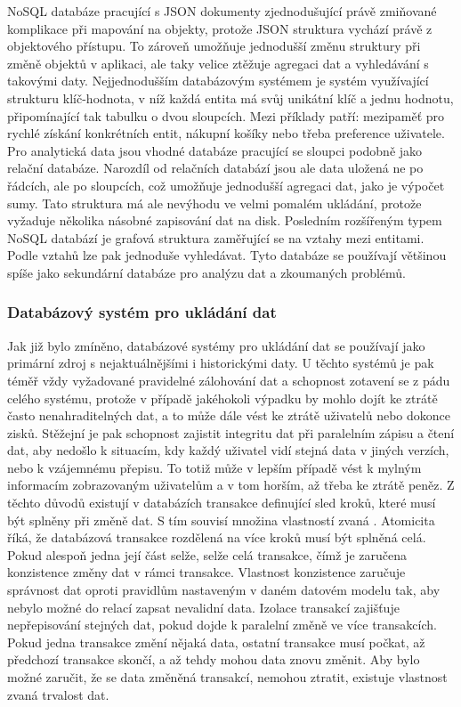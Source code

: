 	\Ac{NoSQL} databáze pracující s \Ac{JSON} dokumenty zjednodušující právě zmiňované komplikace při mapování
	na objekty, protože \Ac{JSON} struktura vychází právě z objektového přístupu.
	To zároveň umožňuje jednodušší změnu struktury při změně objektů v aplikaci, ale taky velice ztěžuje agregaci dat
	a vyhledávání s takovými daty.
	Nejjednodušším databázovým systémem je systém využívající strukturu klíč-hodnota, v níž každá entita má svůj unikátní klíč
	a jednu hodnotu, připomínající tak tabulku o dvou sloupcích.
	Mezi příklady patří: mezipaměť pro rychlé získání konkrétních entit, nákupní košíky nebo třeba preference uživatele.
	Pro analytická data jsou vhodné databáze pracující se sloupci podobně jako relační databáze.
	Narozdíl od relačních databází jsou ale data uložená ne po řádcích, ale po sloupcích, což umožňuje jednodušší agregaci
	dat, jako je výpočet sumy.
	Tato struktura má ale nevýhodu ve velmi pomalém ukládání, protože vyžaduje několika násobné zapisování dat na disk.
	Posledním rozšířeným typem \Ac{NoSQL} databází je grafová struktura zaměřující se na vztahy mezi
	entitami.
	Podle vztahů lze pak jednoduše vyhledávat.
	Tyto databáze se používají většinou spíše jako sekundární databáze pro analýzu dat a zkoumaných problémů.
	\cite{types-of-nosql-databases}

		\subsubsection{Databázový systém pro ukládání dat}

		Jak již bylo zmíněno, databázové systémy pro ukládání dat se používají jako primární zdroj s nejaktuálnějšími i
		historickými daty.
		U těchto systémů je pak téměř vždy vyžadované pravidelné zálohování dat a schopnost zotavení se z pádu celého
		systému, protože v případě jakéhokoli výpadku by mohlo dojít ke ztrátě často nenahraditelných dat, a to může
		dále vést ke ztrátě uživatelů nebo dokonce zisků.
		Stěžejní je pak schopnost zajistit integritu dat při paralelním zápisu a čtení dat, aby nedošlo k situacím,
		kdy každý uživatel vidí stejná data v jiných verzích, nebo k vzájemnému přepisu.
		To totiž může v lepším případě vést k mylným informacím zobrazovaným uživatelům a v tom horším, až třeba ke ztrátě
		peněz.
		Z těchto důvodů existují v databázích transakce definující sled kroků, které musí být splněny při změně dat.
		S tím souvisí množina vlastností zvaná .
		Atomicita říká, že databázová transakce rozdělená na více kroků musí být splněná celá.
		Pokud alespoň jedna její část selže, selže celá transakce, čímž je zaručena konzistence změny dat v rámci transakce.
		Vlastnost konzistence zaručuje správnost dat oproti pravidlům nastaveným v daném datovém modelu tak, aby nebylo možné
		do relací zapsat nevalidní data.
		Izolace transakcí zajišťuje nepřepisování stejných dat, pokud dojde k paralelní změně ve více
		transakcích.
		Pokud jedna transakce změní nějaká data, ostatní transakce musí počkat, až předchozí transakce skončí, a až tehdy
		mohou data znovu změnit.
		Aby bylo možné zaručit, že se data změněná transakcí, nemohou ztratit, existuje vlastnost
		zvaná trvalost dat. \cite{acid-compliance}

